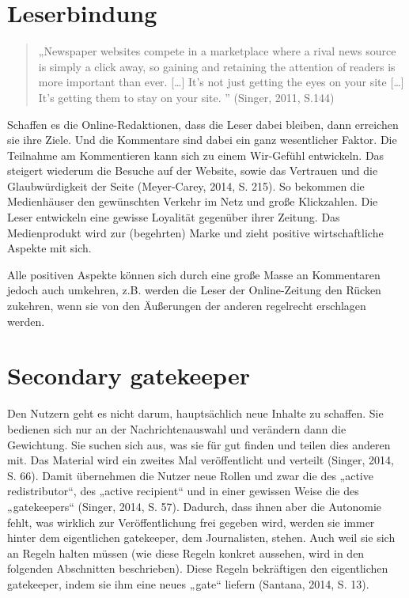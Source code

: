 \section{Leserbindung}

\begin{quote}
„Newspaper websites compete in a marketplace where a rival news source is simply
a click away, so gaining and retaining the attention of readers is more
important than ever. [\ldots] It’s not just getting the eyes on your site
[\ldots] It’s getting them to stay on your site. ” (Singer, 2011, S.144)
\end{quote}

Schaffen es die Online-Redaktionen, dass die Leser dabei bleiben, dann erreichen
sie ihre Ziele. Und die Kommentare sind dabei ein ganz wesentlicher Faktor. Die
Teilnahme am Kommentieren kann sich zu einem Wir-Gefühl entwickeln. Das steigert
wiederum die Besuche auf der Website, sowie das Vertrauen und die
Glaubwürdigkeit der Seite (Meyer-Carey, 2014, S. 215). So bekommen die
Medienhäuser den gewünschten Verkehr im Netz und große Klickzahlen. Die Leser
entwickeln eine gewisse Loyalität gegenüber ihrer Zeitung. Das Medienprodukt
wird zur (begehrten) Marke und zieht positive wirtschaftliche Aspekte mit sich.

Alle positiven Aspekte können sich durch eine große Masse an Kommentaren jedoch
auch umkehren, z.B. werden die Leser der Online-Zeitung den Rücken zukehren,
wenn sie von den Äußerungen der anderen regelrecht erschlagen werden.


\section{Secondary gatekeeper}

Den Nutzern geht es nicht darum, hauptsächlich neue Inhalte zu schaffen. Sie
bedienen sich nur an der Nachrichtenauswahl und verändern dann die Gewichtung.
Sie suchen sich aus, was sie für gut finden und teilen dies anderen mit. Das
Material wird ein zweites Mal veröffentlicht und verteilt (Singer, 2014, S. 66).
Damit übernehmen die Nutzer neue Rollen und zwar die des „active redistributor“,
des „active recipient“ und in einer gewissen Weise die des „gatekeepers“
(Singer, 2014, S. 57). Dadurch, dass ihnen aber die Autonomie fehlt, was
wirklich zur Veröffentlichung frei gegeben wird, werden sie immer hinter dem
eigentlichen gatekeeper, dem Journalisten, stehen. Auch weil sie sich an Regeln
halten müssen (wie diese Regeln konkret aussehen, wird in den folgenden
Abschnitten beschrieben). Diese Regeln bekräftigen den eigentlichen gatekeeper,
indem sie ihm eine neues „gate“ liefern (Santana, 2014, S. 13).


